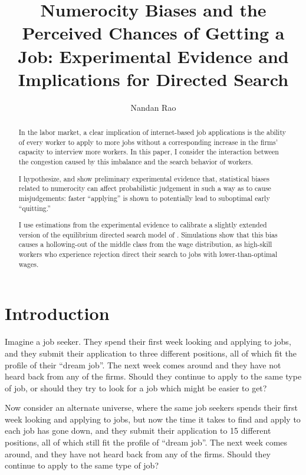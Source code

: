 \documentclass[a4paper,12pt]{article}
\begin{document}
\title{ Numerocity Biases and the Perceived Chances of Getting a Job: Experimental Evidence and Implications for Directed Search }

\author{Nandan Rao}

\maketitle

\begin{abstract}

In the labor market, a clear implication of internet-based job applications is the ability of every worker to apply to more jobs without a corresponding increase in the firms' capacity to interview more workers. In this paper, I consider the interaction between the congestion caused by this imbalance and the search behavior of workers.

I hypothesize, and show preliminary experimental evidence that, statistical biases related to numerocity can affect probabilistic judgement in such a way as to cause misjudgements: faster ``applying'' is shown to potentially lead to suboptimal early ``quitting.''

I use estimations from the experimental evidence to calibrate a slightly extended version of the equilibrium directed search model of \cite{gonzalez2010}. Simulations show that this bias causes a hollowing-out of the middle class from the wage distribution, as high-skill workers who experience rejection direct their search to jobs with lower-than-optimal wages.

\end{abstract}

\section{Introduction}

Imagine a job seeker. They spend their first week looking and applying to jobs, and they submit their application to three different positions, all of which fit the profile of their ``dream job''. The next week comes around and they have not heard back from any of the firms. Should they continue to apply to the same type of job, or should they try to look for a job which might be easier to get?

Now consider an alternate universe, where the same job seekers spends their first week looking and applying to jobs, but now the time it takes to find and apply to each job has gone down, and they submit their application to 15 different positions, all of which still fit the profile of ``dream job''. The next week comes around, and they have not heard back from any of the firms. Should they continue to apply to the same type of job?
\end{document}
